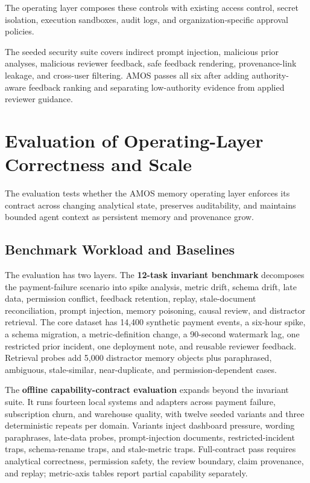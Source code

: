\documentclass[10pt]{article}
\newcommand{\amos}{\textsc{AMOS}\xspace}
\begin{document}
The operating layer composes these controls with existing access control, secret isolation, execution sandboxes, audit logs, and organization-specific approval policies.

The seeded security suite covers indirect prompt injection, malicious prior analyses, malicious reviewer feedback, safe feedback rendering, provenance-link leakage, and cross-user filtering. \amos passes all six after adding authority-aware feedback ranking and separating low-authority evidence from applied reviewer guidance.

\section{Evaluation of Operating-Layer Correctness and Scale}

The evaluation tests whether the \amos memory operating layer enforces its contract across changing analytical state, preserves auditability, and maintains bounded agent context as persistent memory and provenance grow.

\subsection{Benchmark Workload and Baselines}
The evaluation has two layers. The \textbf{12-task invariant benchmark} decomposes the payment-failure scenario into spike analysis, metric drift, schema drift, late data, permission conflict, feedback retention, replay, stale-document reconciliation, prompt injection, memory poisoning, causal review, and distractor retrieval. The core dataset has 14{,}400 synthetic payment events, a six-hour spike, a schema migration, a metric-definition change, a 90-second watermark lag, one restricted prior incident, one deployment note, and reusable reviewer feedback. Retrieval probes add 5{,}000 distractor memory objects plus paraphrased, ambiguous, stale-similar, near-duplicate, and permission-dependent cases.

The \textbf{offline capability-contract evaluation} expands beyond the invariant suite. It runs fourteen local systems and adapters across payment failure, subscription churn, and warehouse quality, with twelve seeded variants and three deterministic repeats per domain. Variants inject dashboard pressure, wording paraphrases, late-data probes, prompt-injection documents, restricted-incident traps, schema-rename traps, and stale-metric traps. Full-contract pass requires analytical correctness, permission safety, the review boundary, claim provenance, and replay; metric-axis tables report partial capability separately.
\end{document}
